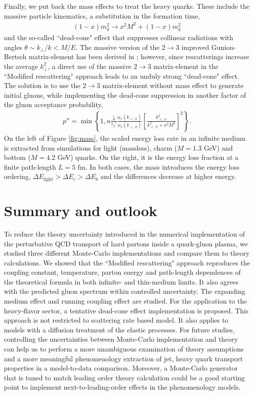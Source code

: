 \documentclass[aps, prc, reprint, amsmath, groupedaddress, nofootinbib]{revtex4-1}
\begin{document}
Finally, we put back the mass effects to treat the heavy quarks. These include the massive particle kinematics, a substitution in the formation time,
\begin{eqnarray}
(1-x)m_g^2 \rightarrow x^2M^2 + (1-x)m_g^2
\end{eqnarray}
and the so-called ``dead-cone" effect that suppresses collinear radiations with angles $\theta \sim k_\perp/k < M/E$. 
The massive version of the $2\rightarrow3$ improved Gunion-Bertsch matrix-element has been derived in \cite{Uphoff:2014hza}; however, since rescatterings increase the average $k_{\perp}^2$, a direct use of the massive $2\rightarrow3$ matrix-element in the ``Modified rescattering" approach leads to an unduly strong ``dead-cone" effect.
The solution is to use the $2\rightarrow3$ matrix-element without mass effect to generate initial gluons, while implementing the dead-cone suppression in another factor of the gluon acceptance probability,
\begin{eqnarray}
p'' = \min\left\{1, u\frac{\tilde{\lambda}}{\tau_f'}\frac{\alpha_s(k_{\perp,n})}{\alpha_s(k_{\perp,0})} \left[\frac{k_{\perp,n}^2}{k_{\perp,n}^2+x^2 M^2}\right]^2\right\}.
\end{eqnarray}
On the left of Figure \ref{fig:mass}, the scaled energy loss rate in an infinite medium is extracted from simulations for light (massless), charm ($M=1.3$ GeV) and bottom ($M=4.2$ GeV) quarks. 
On the right, it is the energy loss fraction at a finite path-length $L=5$ fm.
In both cases, the mass introduces the energy loss ordering, $\Delta E_{\textrm{light}} > \Delta E_c > \Delta E_b$ and the differences decrease at higher energy.

\section{Summary and outlook}\label{section:summary}
To reduce the theory uncertainty introduced in the numerical implementation of the perturbative QCD transport of hard partons inside a quark-gluon plasma, we studied three different Monte-Carlo implementations and compare them to theory calculations.
We showed that the ``Modified rescattering" approach reproduces the coupling constant, temperature, parton energy and path-length dependences of the theoretical formula in both infinite- and thin-medium limits.
It also agrees with the predicted gluon spectrum within controlled uncertainty.
The expanding medium effect and running coupling effect are studied. For the application to the heavy-flavor sector, a tentative dead-cone effect implementation is proposed.
This approach is not restricted to scattering rate based model. 
It also applies to models with a diffusion treatment of the elastic processes. 
For future studies, controlling the uncertainties between Monte-Carlo implementation and theory can help us to perform a more unambiguous examination of theory assumptions and a more meaningful phenomenology extraction of jet, heavy quark transport properties in a model-to-data comparison.
Moreover, a Monte-Carlo generator that is tuned to match leading order theory calculation could be a good starting point to implement next-to-leading-order effects in the phenomenology models.
\end{document}
